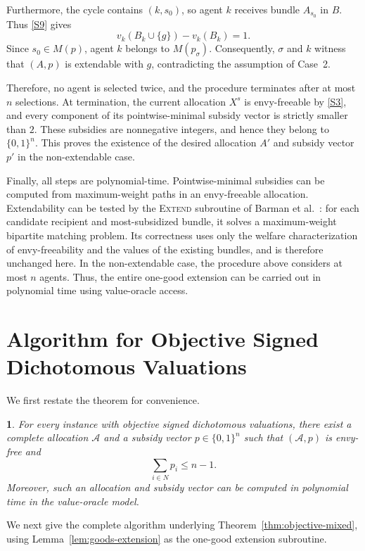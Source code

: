 \documentclass[11pt]{article}
\makeatletter
\theoremstyle{plain}
\theoremstyle{plain}
\newcommand{\restatedname}{}
\newtheorem*{restated}{\restatedname}
\renewenvironment{proof}[1][\proofname]{\par
  \pushQED{\qed}%
  \normalfont \topsep6\p@\@plus6\p@\relax
  \trivlist
  \item[\hskip\labelsep\bfseries #1\@addpunct{}]\ignorespaces
}{%
  \popQED\endtrivlist\@endpefalse
}
\newcommand{\alloc}{\mathcal{A}}              %
\makeatother
\begin{document}
\begin{proof}
Furthermore, the cycle contains $(k,s_0)$, so agent $k$ receives bundle $A_{s_0}$ in $B$. Thus \eqref{S9} gives
\[
v_k(B_k\cup\{g\})-v_k(B_k)=1.
\]
Since $s_0\in M(p)$, agent $k$ belongs to $M(p_\sigma)$. Consequently, $\sigma$ and $k$ witness that $(A,p)$ is extendable with $g$, contradicting the assumption of Case~2.

Therefore, no agent is selected twice, and the procedure terminates after at most $n$ selections. At termination, the current allocation $X^s$ is envy-freeable by \eqref{S3}, and every component of its pointwise-minimal subsidy vector is strictly smaller than $2$. These subsidies are nonnegative integers, and hence they belong to $\{0,1\}^n$. This proves the existence of the desired allocation $A'$ and subsidy vector $p'$ in the non-extendable case.

Finally, all steps are polynomial-time. Pointwise-minimal subsidies can be computed from maximum-weight paths in an envy-freeable allocation. Extendability can be tested by the \textsc{Extend} subroutine of Barman et al.~\cite{BKNS22}: for each candidate recipient and most-subsidized bundle, it solves a maximum-weight bipartite matching problem. Its correctness uses only the welfare characterization of envy-freeability and the values of the existing bundles, and is therefore unchanged here. In the non-extendable case, the procedure above considers at most $n$ agents. Thus, the entire one-good extension can be carried out in polynomial time using value-oracle access.
\end{proof}

\section{Algorithm for Objective Signed Dichotomous Valuations}
\label{app:objective-mixed-alg}
We first restate the theorem for convenience.
\renewcommand{\restatedname}{Theorem~\ref{thm:objective-mixed}}
\begin{restated}
For every instance with objective signed dichotomous valuations, there exist a complete allocation $\alloc$ and a subsidy vector $p\in\{0,1\}^n$ such that $(\alloc,p)$ is envy-free and
\[
\sum_{i\in N} p_i\leq n-1.
\]
Moreover, such an allocation and subsidy vector can be computed in
polynomial time in the value-oracle model.
\end{restated}
We next give the complete algorithm underlying Theorem~\ref{thm:objective-mixed}, using Lemma~\ref{lem:goods-extension} as the one-good extension subroutine.
\end{document}
